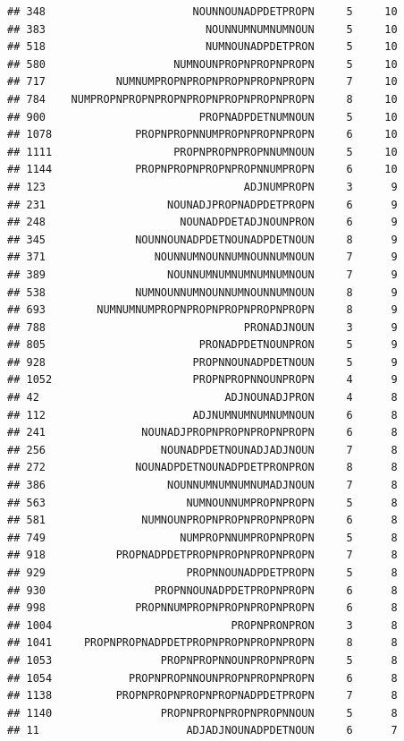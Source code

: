 \documentclass[]{article}
\begin{document}
\begin{verbatim}
## 348                       NOUNNOUNADPDETPROPN     5     10
## 383                         NOUNNUMNUMNUMNOUN     5     10
## 518                         NUMNOUNADPDETPRON     5     10
## 580                    NUMNOUNPROPNPROPNPROPN     5     10
## 717           NUMNUMPROPNPROPNPROPNPROPNPROPN     7     10
## 784    NUMPROPNPROPNPROPNPROPNPROPNPROPNPROPN     8     10
## 900                        PROPNADPDETNUMNOUN     5     10
## 1078             PROPNPROPNNUMPROPNPROPNPROPN     6     10
## 1111                   PROPNPROPNPROPNNUMNOUN     5     10
## 1144             PROPNPROPNPROPNPROPNNUMPROPN     6     10
## 123                               ADJNUMPROPN     3      9
## 231                   NOUNADJPROPNADPDETPROPN     6      9
## 248                     NOUNADPDETADJNOUNPRON     6      9
## 345              NOUNNOUNADPDETNOUNADPDETNOUN     8      9
## 371                 NOUNNUMNOUNNUMNOUNNUMNOUN     7      9
## 389                   NOUNNUMNUMNUMNUMNUMNOUN     7      9
## 538              NUMNOUNNUMNOUNNUMNOUNNUMNOUN     8      9
## 693        NUMNUMNUMPROPNPROPNPROPNPROPNPROPN     8      9
## 788                               PRONADJNOUN     3      9
## 805                        PRONADPDETNOUNPRON     5      9
## 928                       PROPNNOUNADPDETNOUN     5      9
## 1052                      PROPNPROPNNOUNPROPN     4      9
## 42                             ADJNOUNADJPRON     4      8
## 112                       ADJNUMNUMNUMNUMNOUN     6      8
## 241               NOUNADJPROPNPROPNPROPNPROPN     6      8
## 256                  NOUNADPDETNOUNADJADJNOUN     7      8
## 272              NOUNADPDETNOUNADPDETPRONPRON     8      8
## 386                   NOUNNUMNUMNUMNUMADJNOUN     7      8
## 563                      NUMNOUNNUMPROPNPROPN     5      8
## 581               NUMNOUNPROPNPROPNPROPNPROPN     6      8
## 749                     NUMPROPNNUMPROPNPROPN     5      8
## 918           PROPNADPDETPROPNPROPNPROPNPROPN     7      8
## 929                      PROPNNOUNADPDETPROPN     5      8
## 930                 PROPNNOUNADPDETPROPNPROPN     6      8
## 998              PROPNNUMPROPNPROPNPROPNPROPN     6      8
## 1004                            PROPNPRONPRON     3      8
## 1041     PROPNPROPNADPDETPROPNPROPNPROPNPROPN     8      8
## 1053                 PROPNPROPNNOUNPROPNPROPN     5      8
## 1054            PROPNPROPNNOUNPROPNPROPNPROPN     6      8
## 1138          PROPNPROPNPROPNPROPNADPDETPROPN     7      8
## 1140                 PROPNPROPNPROPNPROPNNOUN     5      8
## 11                       ADJADJNOUNADPDETNOUN     6      7

\end{verbatim}
\end{document}
